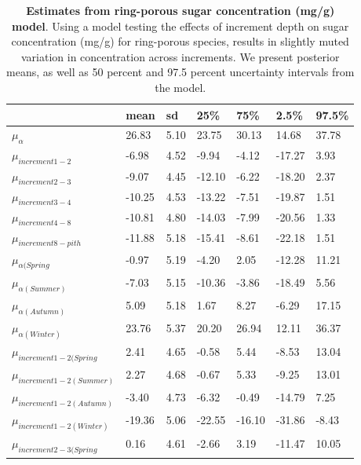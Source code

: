 \documentclass{article}\usepackage[]{graphicx}\usepackage[]{color}
\begin{document}
\begin{table}[ht]
\centering
\caption{\textbf{Estimates from ring-porous sugar concentration (mg/g) model}. Using a model testing the effects of increment depth on sugar concentration (mg/g) for ring-porous species, results in slightly muted variation in concentration across increments. We present posterior means, as well as 50 percent and 97.5 percent uncertainty intervals from the model.} 
\label{tab:ringsug}
\begingroup\footnotesize
\begin{tabular}{|p{}|p{}|p{}|p{}|p{}|p{}|p{}|}
  \hline
 & mean & sd & 25\% & 75\% & 2.5\% & 97.5\% \\ 
  \hline
$\mu_{\alpha}$ & 26.83 & 5.10 & 23.75 & 30.13 & 14.68 & 37.78 \\ 
  $\mu_{increment 1-2}$ & -6.98 & 4.52 & -9.94 & -4.12 & -17.27 & 3.93 \\ 
  $\mu_{increment 2-3}$ & -9.07 & 4.45 & -12.10 & -6.22 & -18.20 & 2.37 \\ 
  $\mu_{increment 3-4}$ & -10.25 & 4.53 & -13.22 & -7.51 & -19.87 & 1.51 \\ 
  $\mu_{increment 4-8}$ & -10.81 & 4.80 & -14.03 & -7.99 & -20.56 & 1.33 \\ 
  $\mu_{increment 8-pith}$ & -11.88 & 5.18 & -15.41 & -8.61 & -22.18 & 1.51 \\ 
  $\mu_{\alpha (Spring}$ & -0.97 & 5.19 & -4.20 & 2.05 & -12.28 & 11.21 \\ 
  $\mu_{\alpha (Summer)}$ & -7.03 & 5.15 & -10.36 & -3.86 & -18.49 & 5.56 \\ 
  $\mu_{\alpha (Autumn)}$ & 5.09 & 5.18 & 1.67 & 8.27 & -6.29 & 17.15 \\ 
  $\mu_{\alpha (Winter)}$ & 23.76 & 5.37 & 20.20 & 26.94 & 12.11 & 36.37 \\ 
  $\mu_{increment 1-2 (Spring}$ & 2.41 & 4.65 & -0.58 & 5.44 & -8.53 & 13.04 \\ 
  $\mu_{increment 1-2 (Summer)}$ & 2.27 & 4.68 & -0.67 & 5.33 & -9.25 & 13.01 \\ 
  $\mu_{increment 1-2 (Autumn)}$ & -3.40 & 4.73 & -6.32 & -0.49 & -14.79 & 7.25 \\ 
  $\mu_{increment 1-2 (Winter)}$ & -19.36 & 5.06 & -22.55 & -16.10 & -31.86 & -8.43 \\ 
  $\mu_{increment 2-3 (Spring}$ & 0.16 & 4.61 & -2.66 & 3.19 & -11.47 & 10.05 \\ 

\end{tabular}
\end{table}
\end{document}
